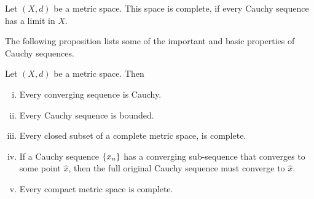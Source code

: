 \begin{definition}
	Let $(X,d)$ be a metric space. This space is complete, if every Cauchy sequence has a limit in $X$.
\end{definition}

The following proposition lists some of the important and basic properties of Cauchy sequences.

\begin{proposition}
	Let $(X,d)$ be a metric space. Then 
	\begin{enumerate}[(i)]
		\item Every converging sequence is Cauchy.
		\item Every Cauchy sequence is bounded.
		\item Every closed subset of a complete metric space, is complete.
		\item If a Cauchy sequence $\{x_n\}$ has a converging sub-sequence that converges to some point $\hat{x}$, then the full original Cauchy sequence must converge to $\hat{x}$.
		\item Every compact metric space is complete.
	\end{enumerate}
\end{proposition}

